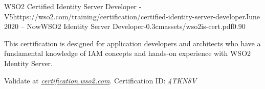 \documentclass{mycv}
\begin{document}
	\vspace{0.75cm}
	
	\begin{EntryDatedLogo}{WSO2 Certified Identity Server
			Developer - V5}{https://wso2.com/training/certification/certified-identity-server-developer}{June 2020 -- Now}{WSO2 Identity Server Developer}{-0.3cm}{assets/wso2is-cert.pdf}{0.90}
		\begin{Itemize}
			\item This certification is designed for application developers and architects who have a fundamental knowledge of IAM concepts and hands-on experience with WSO2 Identity Server. 
			\item Validate at \href{https://certification.wso2.com}{\textit{certification.wso2.com}}. Certification ID: \textit{4TKN8V}
		\end{Itemize}
	\end{EntryDatedLogo}

	
	

\end{document}
